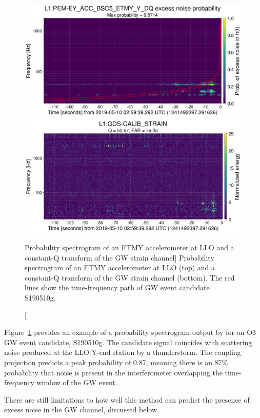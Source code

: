 \begin{figure}[h!]
	\includegraphics[width=\textwidth]{figures/noise-studies/vetting-spectrogram1.png}
	\includegraphics[width=\textwidth]{figures/noise-studies/vetting-spectrogram2.png}
	\caption
	[Probability spectrogram of an ETMY accelerometer at LLO and a constant-Q transform of the GW strain channel]
	{
		Probability spectrogram of an ETMY accelerometer at LLO (top) and a constant-Q transform of the GW strain channel (bottom).
		The red lines show the time-frequency path of GW event candidate S190510g.}
	\label{fig:vetting-spectrograms}
\end{figure}

Figure~\ref{fig:vetting-spectrograms} provides an example of a probability spectrogram output by  for an \ac{O3} \ac{GW} event candidate, S190510g.
The candidate signal coincides with scattering noise produced at the \ac{LLO} Y-end station by a thunderstorm.
The coupling projection predicts a peak probability of 0.87, meaning there is an 87\% probability that noise is present in the interferometer overlapping the time-frequency window of the \ac{GW} event.

There are still limitations to how well this method can predict the presence of excess noise in the \ac{GW} channel, discussed below.

